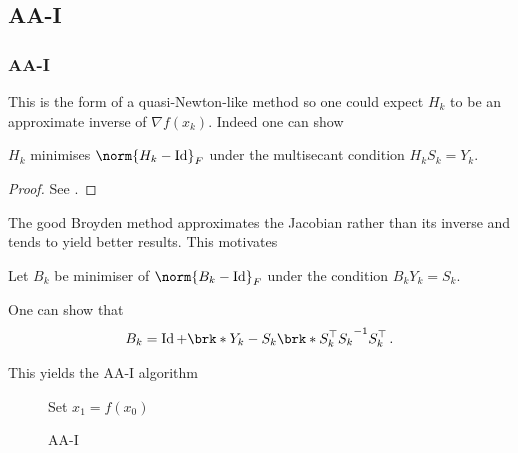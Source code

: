 \subsection{AA-I}
\begin{frame}
	\frametitle{AA-I}
	This is the form of a quasi-Newton-like method so one could expect $H_k$ to be an approximate inverse of $\nabla f(x_k)$. Indeed one can show
	\begin{proposition}
		$H_k$ minimises $\norm{H_k-\Id}_F$ under the multisecant condition $H_kS_k=Y_k$.
	\end{proposition}
	\begin{proof}
		See \cite{ZhaAA}.
	\end{proof}
	The good Broyden method approximates the Jacobian rather than its inverse and tends to yield better results. This motivates
	\begin{definition}
		Let $B_k$ be minimiser of $\norm{B_k-\Id}_F$ under the condition $B_kY_k=S_k$.
	\end{definition}
	One can show that
	\begin{align*}
		B_k = \Id+\brk*{Y_k-S_k}\brk*{S_k^\top S_k}^{-1}S_k^\top\,.
	\end{align*}
\end{frame}

\begin{frame}
	This yields the AA-I algorithm
	\begin{figure}
	\begin{algorithm}[H]
	\caption{AA-I}
	\color{gray}
	\BlankLine
	Set $x_1=f(x_0)$
	
	\end{algorithm}
	\end{figure}
\end{frame}


